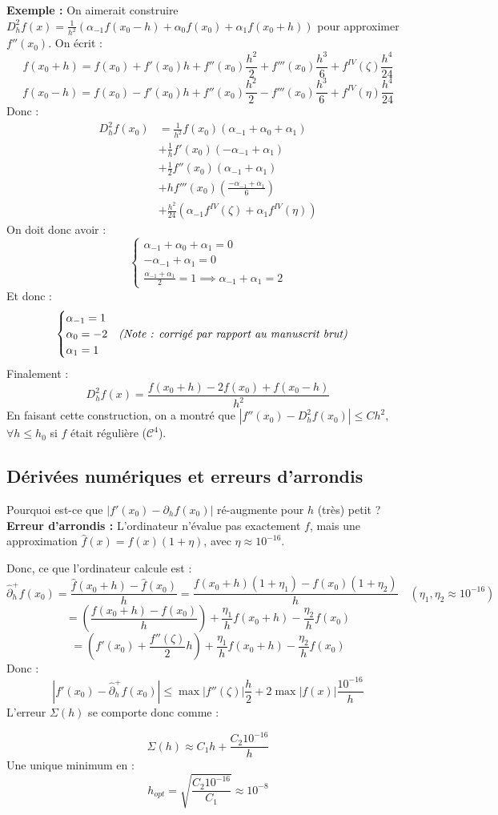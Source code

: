 \textbf{Exemple :} On aimerait construire $D_h^2 f(x) = \frac{1}{h^2}(\alpha_{-1}f(x_0-h) + \alpha_0 f(x_0) + \alpha_1 f(x_0+h))$ pour approximer $f''(x_0)$. On écrit :
$$f(x_0+h) = f(x_0) + f'(x_0)h + f''(x_0)\frac{h^2}{2} + f'''(x_0)\frac{h^3}{6} + f^{IV}(\zeta)\frac{h^4}{24}$$
$$f(x_0-h) = f(x_0) - f'(x_0)h + f''(x_0)\frac{h^2}{2} - f'''(x_0)\frac{h^3}{6} + f^{IV}(\eta)\frac{h^4}{24}$$
Donc :
\begin{align*}
D_h^2 f(x_0) &= \frac{1}{h^2} f(x_0)(\alpha_{-1}+\alpha_0+\alpha_1) \\
             &+ \frac{1}{h} f'(x_0)(-\alpha_{-1}+\alpha_1) \\
             &+ \frac{1}{2} f''(x_0)(\alpha_{-1}+\alpha_1) \\
             &+ h f'''(x_0)\left(\frac{-\alpha_{-1}+\alpha_1}{6}\right) \\
             &+ \frac{h^2}{24}(\alpha_{-1}f^{IV}(\zeta) + \alpha_1 f^{IV}(\eta))
\end{align*}
On doit donc avoir :
$$\begin{cases} \alpha_{-1}+\alpha_0+\alpha_1 = 0 \\ -\alpha_{-1}+\alpha_1 = 0 \\ \frac{\alpha_{-1}+\alpha_1}{2} = 1 \implies \alpha_{-1}+\alpha_1 = 2 \end{cases}$$
Et donc :
$$\begin{cases} \alpha_{-1} = 1 \\ \alpha_0 = -2 \quad \text{\textit{(Note : corrigé par rapport au manuscrit brut)}} \\ \alpha_1 = 1 \end{cases}$$
Finalement :
$$D_h^2 f(x) = \frac{f(x_0+h) - 2f(x_0) + f(x_0-h)}{h^2}$$
En faisant cette construction, on a montré que $|f''(x_0) - D_h^2 f(x_0)| \le Ch^2$, $\forall h \le h_0$ si $f$ était régulière ($\mathcal{C}^4$).

\subsection{Dérivées numériques et erreurs d'arrondis}

Pourquoi est-ce que $|f'(x_0) - \partial_h f(x_0)|$ ré-augmente pour $h$ (très) petit ?
\textbf{Erreur d'arrondis :} L'ordinateur n'évalue pas exactement $f$, mais une approximation $\hat{f}(x) = f(x)(1+\eta)$, avec $\eta \approx 10^{-16}$.

Donc, ce que l'ordinateur calcule est :
$$\hat{\partial}_h^+ f(x_0) = \frac{\hat{f}(x_0+h) - \hat{f}(x_0)}{h} = \frac{f(x_0+h)(1+\eta_1) - f(x_0)(1+\eta_2)}{h} \quad (\eta_1, \eta_2 \approx 10^{-16})$$
$$= \left( \frac{f(x_0+h)-f(x_0)}{h} \right) + \frac{\eta_1}{h}f(x_0+h) - \frac{\eta_2}{h}f(x_0)$$
$$= \left( f'(x_0) + \frac{f''(\zeta)}{2}h \right) + \frac{\eta_1}{h}f(x_0+h) - \frac{\eta_2}{h}f(x_0)$$
Donc :
$$|f'(x_0) - \hat{\partial}_h^+ f(x_0)| \le \max|f''(\zeta)|\frac{h}{2} + 2\max|f(x)|\frac{10^{-16}}{h}$$
L'erreur $\Sigma(h)$ se comporte donc comme :
\begin{remarque}
$$\Sigma(h) \approx C_1 h + \frac{C_2 10^{-16}}{h}$$
Une unique minimum en :
$$h_{opt} = \sqrt{\frac{C_2 10^{-16}}{C_1}} \approx 10^{-8}$$
\end{remarque}